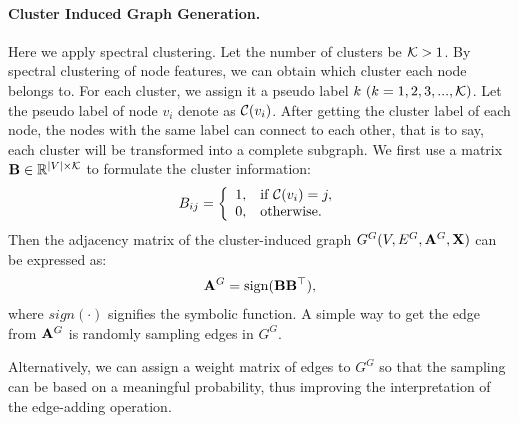 \paragraph{Cluster Induced Graph Generation.}
Here we apply spectral clustering.
Let the number of clusters be $\mathcal{K} >1$. 
By spectral clustering of node features, we can obtain which cluster each node belongs to. For each cluster, we assign it a pseudo label $k ~(k=1,2,3,...,\mathcal{K})$.   Let the pseudo label of node $v_i$  denote as $\mathcal{C}(v_i)$.
After getting the cluster label of each node, the nodes with  the same label can connect to each other, that is to say, each cluster will be transformed into a complete subgraph. 
We first use a matrix $\mathbf{B}\in\mathbb{R}^{|V|\times \mathcal{K}}$ to formulate the cluster information:
\begin{align}
\label{eq:incidence_matrix}
    B_{ij} = \left\{\begin{array}{cl}
	1, &\text{if } \mathcal{C}(v_i) = j, \\
	0, & \text{otherwise.}
 \end{array}\right.
\end{align}
Then the adjacency matrix of the cluster-induced graph $G^G(V,E^G,\mathbf{A}^G,\mathbf{X})$ can be expressed as:
\begin{align}
    \mathbf{A}^G = \operatorname{sign}(\mathbf B \mathbf{B}^{\top}),
\end{align}
where $sign(\cdot)$ signifies the symbolic function. A simple way to get the edge from $\mathbf{A}^G$ is randomly sampling edges in $G^G$. 

Alternatively, we can assign a weight matrix of edges to $G^G$ so that the sampling can be based on a meaningful probability, thus improving the interpretation of the edge-adding operation.

